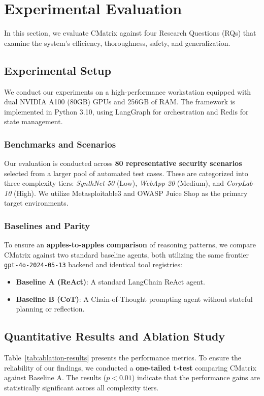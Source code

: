 \section{Experimental Evaluation}

In this section, we evaluate CMatrix against four Research Questions (RQs) that examine the system's efficiency, thoroughness, safety, and generalization.

\subsection{Experimental Setup}
We conduct our experiments on a high-performance workstation equipped with dual NVIDIA A100 (80GB) GPUs and 256GB of RAM. The framework is implemented in Python 3.10, using LangGraph for orchestration and Redis for state management. 

\subsubsection{Benchmarks and Scenarios}
Our evaluation is conducted across \textbf{80 representative security scenarios} selected from a larger pool of automated test cases. These are categorized into three complexity tiers: \textit{SynthNet-50} (Low), \textit{WebApp-20} (Medium), and \textit{CorpLab-10} (High). We utilize Metasploitable3 and OWASP Juice Shop as the primary target environments.



\subsubsection{Baselines and Parity}
To ensure an \textbf{apples-to-apples comparison} of reasoning patterns, we compare CMatrix against two standard baseline agents, both utilizing the same frontier \texttt{gpt-4o-2024-05-13} backend and identical tool registries:
\begin{itemize}
    \item \textbf{Baseline A (ReAct)}: A standard LangChain ReAct agent.
    \item \textbf{Baseline B (CoT)}: A Chain-of-Thought prompting agent without stateful planning or reflection.
\end{itemize}



\subsection{Quantitative Results and Ablation Study}
Table~\ref{tab:ablation-results} presents the performance metrics. To ensure the reliability of our findings, we conducted a \textbf{one-tailed t-test} comparing CMatrix against Baseline A. The results ($p < 0.01$) indicate that the performance gains are statistically significant across all complexity tiers.

